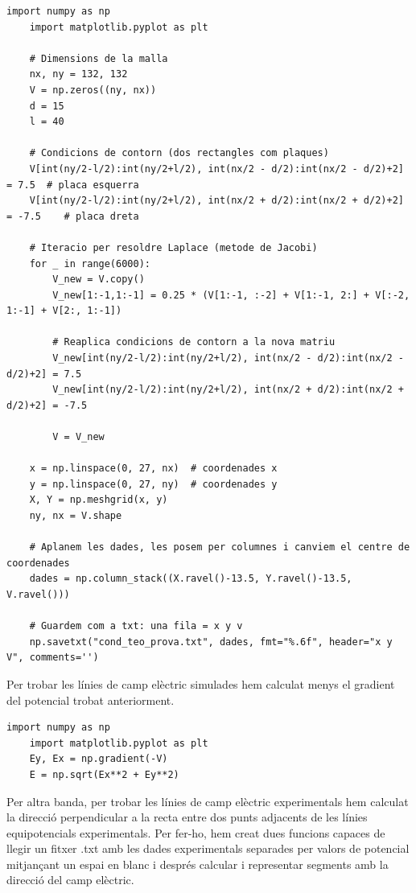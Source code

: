 \documentclass[11pt]{article}
\numberwithin{equation}{section}
\numberwithin{figure}{section}
\numberwithin{table}{section}
\begin{document}
\begin{lstlisting}[caption={Simulació del potencial}, label={lst:simulacio}]
    import numpy as np
    import matplotlib.pyplot as plt

    # Dimensions de la malla
    nx, ny = 132, 132
    V = np.zeros((ny, nx))
    d = 15
    l = 40

    # Condicions de contorn (dos rectangles com plaques)
    V[int(ny/2-l/2):int(ny/2+l/2), int(nx/2 - d/2):int(nx/2 - d/2)+2] = 7.5  # placa esquerra
    V[int(ny/2-l/2):int(ny/2+l/2), int(nx/2 + d/2):int(nx/2 + d/2)+2] = -7.5    # placa dreta

    # Iteracio per resoldre Laplace (metode de Jacobi)
    for _ in range(6000):
        V_new = V.copy()
        V_new[1:-1,1:-1] = 0.25 * (V[1:-1, :-2] + V[1:-1, 2:] + V[:-2, 1:-1] + V[2:, 1:-1])
        
        # Reaplica condicions de contorn a la nova matriu
        V_new[int(ny/2-l/2):int(ny/2+l/2), int(nx/2 - d/2):int(nx/2 - d/2)+2] = 7.5
        V_new[int(ny/2-l/2):int(ny/2+l/2), int(nx/2 + d/2):int(nx/2 + d/2)+2] = -7.5
        
        V = V_new

    x = np.linspace(0, 27, nx)  # coordenades x
    y = np.linspace(0, 27, ny)  # coordenades y
    X, Y = np.meshgrid(x, y)
    ny, nx = V.shape

    # Aplanem les dades, les posem per columnes i canviem el centre de coordenades
    dades = np.column_stack((X.ravel()-13.5, Y.ravel()-13.5, V.ravel()))

    # Guardem com a txt: una fila = x y v
    np.savetxt("cond_teo_prova.txt", dades, fmt="%.6f", header="x y V", comments='')
\end{lstlisting}
Per trobar les línies de camp elèctric simulades hem calculat menys el gradient del potencial trobat anteriorment.
\begin{lstlisting}[caption={Simulació del camp elèctric}, label={lst:simulacio_camp}]
    import numpy as np
    import matplotlib.pyplot as plt
    Ey, Ex = np.gradient(-V)
    E = np.sqrt(Ex**2 + Ey**2)    
\end{lstlisting}

Per altra banda, per trobar les línies de camp elèctric experimentals hem calculat la direcció perpendicular a la recta entre dos punts adjacents de les línies equipotencials experimentals. Per fer-ho, hem creat dues funcions capaces de llegir un fitxer .txt amb les dades experimentals separades per valors de potencial mitjançant un espai en blanc i després calcular i representar segments amb la direcció del camp elèctric.
\end{document}
